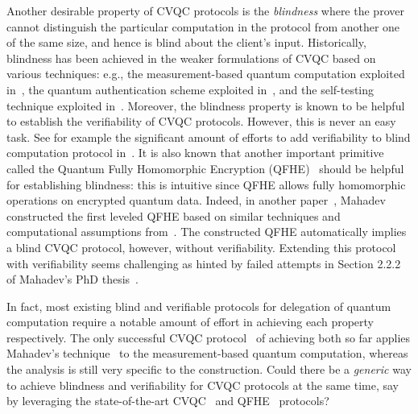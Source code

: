 Another desirable property of CVQC protocols is the \emph{blindness} where the prover cannot distinguish the particular computation in the protocol from another one of the same size, and hence is blind about the client's input.
Historically, blindness has been achieved in the weaker formulations of CVQC based on various techniques: e.g., the measurement-based quantum computation exploited in~\cite{BFK09}, the quantum authentication scheme exploited in~\cite{arXiv:ABOEM17}, and the self-testing technique exploited in~\cite{Nat:RUV13}.
Moreover, the blindness property is known to be helpful to establish the verifiability of CVQC protocols. However, this is never an easy task.
See for example the significant amount of efforts to add verifiability to blind computation protocol in~\cite{FK17}.
It is also known that another important primitive called the Quantum Fully Homomorphic Encryption (QFHE)~\cite{BJ15, DSS16, LC18, NS18, OTF18, mahadev_qfhe} should be helpful for establishing blindness: this is intuitive since QFHE allows fully homomorphic operations on encrypted quantum data. 
Indeed, in another paper~\cite{mahadev_qfhe}, Mahadev constructed the first leveled QFHE based on similar techniques and computational assumptions from~\cite{FOCS:Mahadev18a}.
The constructed QFHE automatically implies a blind CVQC protocol, however, without verifiability.
Extending this protocol with verifiability seems challenging as hinted by failed attempts in Section 2.2.2 of Mahadev's PhD thesis~\cite{mahadev_2018}.

In fact, most existing blind and verifiable protocols for delegation of quantum computation require a notable amount of effort in achieving each property respectively. 
The only successful CVQC protocol~\cite{FOCS:GheVid19} of achieving both so far applies Mahadev's technique~\cite{FOCS:Mahadev18a} to the measurement-based quantum computation, whereas the analysis is still very specific to the construction.
Could there be a \emph{generic} way to achieve blindness and verifiability for CVQC protocols at the same time, say by leveraging the state-of-the-art CVQC~\cite{FOCS:Mahadev18a} and QFHE~\cite{mahadev_qfhe} protocols? 




